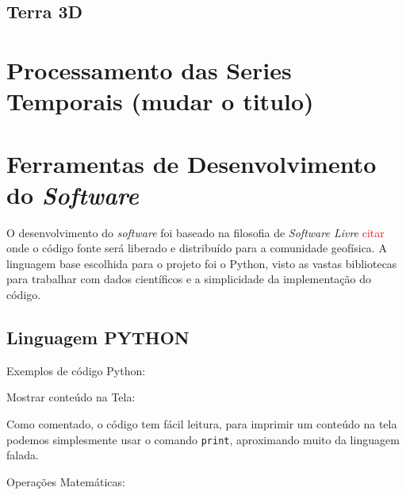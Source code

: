         
        \subsection{Terra 3D}
    
    \section{Processamento das Series Temporais (mudar o titulo)}
    
    \section{Ferramentas de Desenvolvimento do \textit{Software}}
    
        O desenvolvimento do \textit{software} foi baseado na filosofia de \textit{Software Livre} \textcolor{red}{citar} onde o código fonte será liberado e distribuído para a comunidade geofísica. A linguagem base escolhida para o projeto foi o Python, visto as vastas bibliotecas para trabalhar com dados científicos  e a simplicidade da implementação do código.  
        
        \subsection{Linguagem PYTHON}
            \label{lim_python}
            
            Exemplos de código Python:

            Mostrar conteúdo na Tela:
            
            Como comentado, o código tem fácil leitura, para imprimir um conteúdo na tela 
            podemos simplesmente usar o comando \verb|print|, aproximando muito da linguagem falada.  
            \begin{quote}
                                                       

            \end{quote}
            
            Operações Matemáticas:
            
